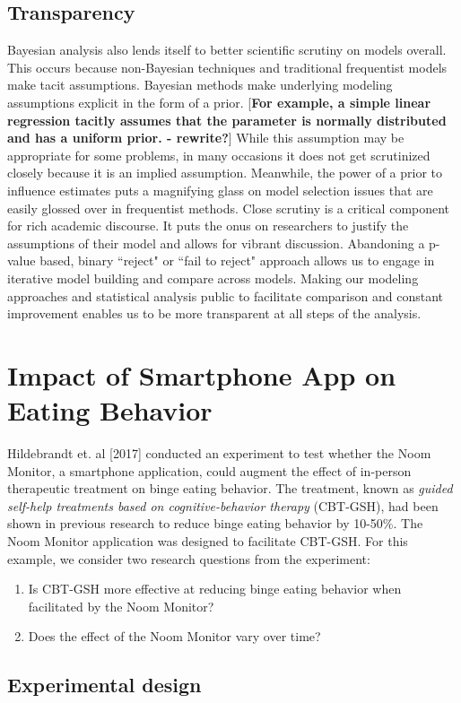\documentclass{article}
\begin{document}
\subsection{Transparency}
Bayesian analysis also lends itself to better scientific scrutiny on models overall. This occurs because non-Bayesian techniques and traditional frequentist models make tacit assumptions. Bayesian methods make underlying modeling assumptions explicit in the form of a prior. [\textbf{For example, a simple linear regression tacitly assumes that the parameter is normally distributed and has a uniform prior. - rewrite?}] While this assumption may be appropriate for some problems, in many occasions it does not get scrutinized closely because it is an implied assumption. Meanwhile, the power of a prior to influence estimates puts a magnifying glass on model selection issues that are easily glossed over in frequentist methods.  Close scrutiny is a critical component for rich academic discourse. It puts the onus on researchers to justify the assumptions of their model and allows for vibrant discussion. Abandoning a p-value based, binary ``reject" or ``fail to reject" approach allows us to engage in iterative model building and compare across models. Making our modeling approaches and statistical analysis public to facilitate comparison and constant improvement enables us to be more transparent at all steps of the analysis.

\section{Impact of Smartphone App on Eating Behavior}
Hildebrandt et. al [2017] conducted an experiment to test whether the Noom Monitor, a smartphone application, could augment the effect of in-person therapeutic treatment on binge eating behavior.  The treatment, known as \emph{guided self-help treatments based on cognitive-behavior therapy} (CBT-GSH), had been shown in previous research to reduce binge eating behavior by 10-50\%.  The Noom Monitor application was designed to facilitate CBT-GSH.  For this example, we consider two research questions from the experiment:
\begin{enumerate}
\item{Is CBT-GSH more effective at reducing binge eating behavior when facilitated by the Noom Monitor?}
\item{Does the effect of the Noom Monitor vary over time?}
\end{enumerate}

\subsection{Experimental design}
\end{document}
